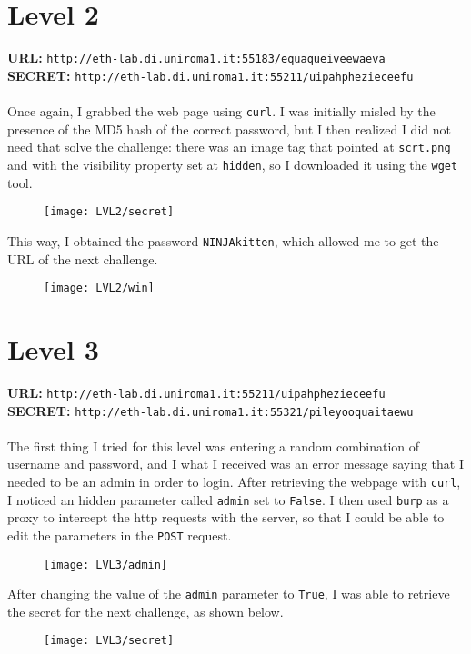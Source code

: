 \documentclass[12pt,a4paper]{article}
\begin{document}
	\section*{Level 2}
	\textbf{URL: }\texttt{http://eth-lab.di.uniroma1.it:55183/equaqueiveewaeva}\\
	\textbf{SECRET: }\texttt{http://eth-lab.di.uniroma1.it:55211/uipahphezieceefu}\\\\
	Once again, I grabbed the web page using \texttt{curl}. I was initially misled by the presence of the MD5 hash of the correct password, but I then realized I did not need that solve the challenge: there was an image tag that pointed at  \texttt{scrt.png} and with the visibility property set at \texttt{hidden}, so I downloaded it using the \texttt{wget} tool.
	\begin{figure}[H]
		\centering
		\texttt{[image: LVL2/secret]}
		\label{fig:secret2}
	\end{figure}
	This way, I obtained the password \texttt{NINJAkitten}, which allowed me to get the URL of the next challenge.
	\begin{figure}[H]
		\centering
		\texttt{[image: LVL2/win]}
		\label{fig:win2}
	\end{figure}

	\section*{Level 3}
	\textbf{URL: }\texttt{http://eth-lab.di.uniroma1.it:55211/uipahphezieceefu}\\
	\textbf{SECRET: }\texttt{http://eth-lab.di.uniroma1.it:55321/pileyooquaitaewu}\\\\
	The first thing I tried for this level was entering a random combination of username and password, and I what I received was an error message saying that I needed to be an admin in order to login. After retrieving the webpage with \texttt{curl}, I noticed an hidden parameter called \texttt{admin} set to \texttt{False}. I then used \texttt{burp} as a proxy to intercept the http requests with the server, so that I could be able to edit the parameters in the \texttt{POST} request.
	\begin{figure}[H]
		\centering
		\texttt{[image: LVL3/admin]}
		\label{fig:admin3}
	\end{figure}After changing the value of the \texttt{admin} parameter to \texttt{True}, I was able to retrieve the secret for the next challenge, as shown below.
	\begin{figure}[H]
		\centering
		\texttt{[image: LVL3/secret]}
		\label{fig:win3}
	\end{figure}	 
\end{document}

